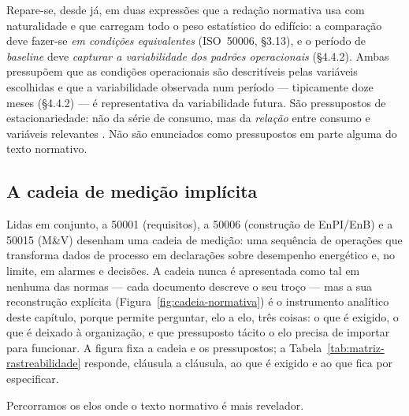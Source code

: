 Repare-se, desde já, em duas expressões que a redação normativa usa com naturalidade e que carregam todo o peso estatístico do edifício: a comparação deve fazer-se \emph{em condições equivalentes} (ISO~50006, \S3.13), e o período de \emph{baseline} deve \emph{capturar a variabilidade dos padrões operacionais} (\S4.4.2). Ambas pressupõem que as condições operacionais são descritíveis pelas variáveis escolhidas e que a variabilidade observada num período --- tipicamente doze meses (\S4.4.2) --- é representativa da variabilidade futura. São pressupostos de estacionariedade: não da série de consumo, mas da
\emph{relação} entre consumo e variáveis relevantes . Não são enunciados como pressupostos em parte alguma do texto normativo.

\subsection{A cadeia de medição implícita}
\label{sec:enb-cadeia}

Lidas em conjunto, a 50001 (requisitos), a 50006 (construção de EnPI/EnB) e a 50015 (M\&V) desenham uma cadeia de medição: uma sequência de operações que transforma dados de processo em declarações sobre desempenho energético e, no limite, em alarmes e decisões. A cadeia nunca é apresentada como tal em nenhuma das normas --- cada documento descreve o seu troço --- mas a sua reconstrução explícita (Figura~\ref{fig:cadeia-normativa}) é o instrumento analítico deste capítulo, porque permite perguntar, elo a elo, três coisas: o que é exigido, o que é deixado à organização, e que pressuposto tácito o elo precisa de importar para funcionar. A figura fixa a cadeia e os pressupostos; a Tabela~\ref{tab:matriz-rastreabilidade} responde, cláusula a cláusula, ao que é exigido e ao que fica por especificar.

\newpage


Percorramos os elos onde o texto normativo é mais revelador.

